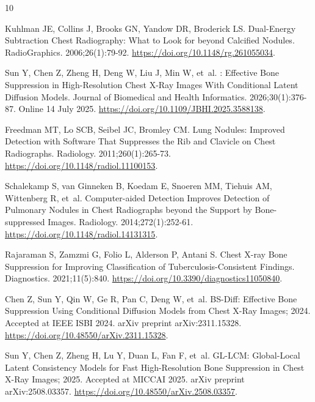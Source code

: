 \begin{thebibliography}{10}

Kuhlman JE, Collins J, Brooks GN, Yandow DR, Broderick LS.
\newblock Dual-Energy Subtraction Chest Radiography: What to Look for beyond
  Calcified Nodules.
\newblock RadioGraphics. 2006;26(1):79-92.
\newblock \url{https://doi.org/10.1148/rg.261055034}.

Sun Y, Chen Z, Zheng H, Deng W, Liu J, Min W, et~al.
: Effective Bone Suppression in High-Resolution Chest {X}-Ray
  Images With Conditional Latent Diffusion Models.
 Journal of Biomedical and Health Informatics.
  2026;30(1):376-87.
\newblock Online 14 July 2025.
\newblock \url{https://doi.org/10.1109/JBHI.2025.3588138}.

Freedman MT, Lo SCB, Seibel JC, Bromley CM.
\newblock Lung Nodules: Improved Detection with Software That Suppresses the
  Rib and Clavicle on Chest Radiographs.
\newblock Radiology. 2011;260(1):265-73.
\newblock \url{https://doi.org/10.1148/radiol.11100153}.

Schalekamp S, van Ginneken B, Koedam E, Snoeren MM, Tiehuis AM, Wittenberg R,
  et~al.
\newblock Computer-aided Detection Improves Detection of Pulmonary Nodules in
  Chest Radiographs beyond the Support by Bone-suppressed Images.
\newblock Radiology. 2014;272(1):252-61.
\newblock \url{https://doi.org/10.1148/radiol.14131315}.

Rajaraman S, Zamzmi G, Folio L, Alderson P, Antani S.
\newblock Chest {X}-ray Bone Suppression for Improving Classification of
  Tuberculosis-Consistent Findings.
\newblock Diagnostics. 2021;11(5):840.
\newblock \url{https://doi.org/10.3390/diagnostics11050840}.

Chen Z, Sun Y, Qin W, Ge R, Pan C, Deng W, et~al. {BS-Diff}: Effective Bone
  Suppression Using Conditional Diffusion Models from Chest {X}-Ray Images;
  2024.
\newblock Accepted at IEEE ISBI 2024.
\newblock arXiv preprint arXiv:2311.15328.
\newblock \url{https://doi.org/10.48550/arXiv.2311.15328}.

Sun Y, Chen Z, Zheng H, Lu Y, Duan L, Fan F, et~al. {GL-LCM}: Global-Local
  Latent Consistency Models for Fast High-Resolution Bone Suppression in Chest
  {X}-Ray Images; 2025.
\newblock Accepted at MICCAI 2025.
\newblock arXiv preprint arXiv:2508.03357.
\newblock \url{https://doi.org/10.48550/arXiv.2508.03357}.


\end{thebibliography}
